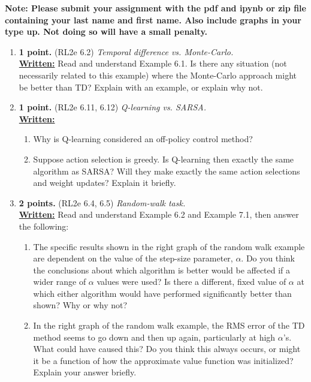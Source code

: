 \documentclass{article}
\begin{document}
\textbf{Note: Please submit your assignment with the pdf and ipynb or zip file containing your last name and first name. Also include graphs in your type up. Not doing so will have a small penalty.}
\begin{enumerate}
	\item \textbf{1 point.} (RL2e 6.2) \textit{Temporal difference vs. Monte-Carlo.} \\
	      \uline{\textbf{Written:}}
	      Read and understand Example 6.1. Is there any situation (not necessarily related to this example) where the Monte-Carlo approach might be better than TD? Explain with an example, or explain why not.\

	\item \textbf{1 point.} (RL2e 6.11, 6.12) \textit{Q-learning vs. SARSA.} \\
	      \uline{\textbf{Written:}}
	      \begin{enumerate}
		      \item Why is Q-learning considered an off-policy control method?

		      \item Suppose action selection is greedy. Is Q-learning then exactly the same algorithm as SARSA? Will they make exactly the same action selections and weight updates? Explain it briefly.

	      \end{enumerate}

	\item \textbf{2 points.} (RL2e 6.4, 6.5) \textit{Random-walk task.} \\
	      \uline{\textbf{Written:}}
	      Read and understand Example 6.2 and Example 7.1, then answer the following:
	      \begin{enumerate}

		      \item The specific results shown in the right graph of the random walk example are dependent on the value of the step-size parameter, $\alpha$. Do you think the conclusions about which algorithm is better would be affected if a wider range of $\alpha$ values were used? Is there a different, fixed value of $\alpha$ at which either algorithm would have performed significantly better than shown? Why or why not?

		      \item In the right graph of the random walk example, the RMS error of the TD method seems to go down and then up again, particularly at high $\alpha$'s. What could have caused this? Do you think this always occurs, or might it be a function of how the approximate value function was initialized? Explain your answer briefly. 


\end{enumerate}
\end{enumerate}
\end{document}
